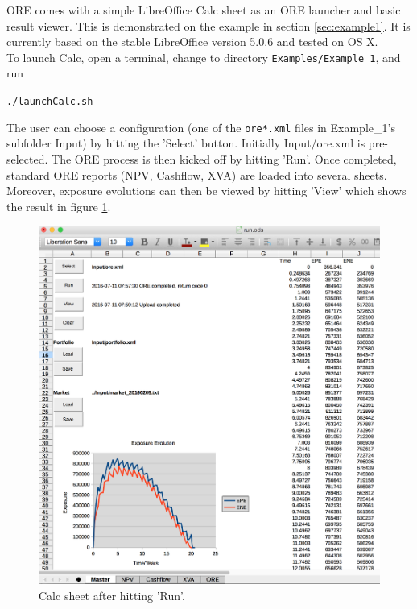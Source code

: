 \documentclass[12pt, a4paper]{article}
\begin{document}
ORE comes with a simple LibreOffice Calc \cite{LO} sheet as an ORE launcher and basic result viewer. This is
demonstrated on the example in section \ref{sec:example1}. It is currently based on the stable LibreOffice version 5.0.6
and tested on OS X. \\

To launch Calc, open a terminal, change to directory {\tt Examples/Example\_1}, and run

\medskip
{\centerline{\tt ./launchCalc.sh} }
\medskip

The user can choose a configuration (one of the {\tt ore*.xml} files in Example\_1's subfolder Input) by hitting the
'Select' button. Initially Input/ore.xml is pre-selected. The ORE process is then kicked off by hitting 'Run'. Once
completed, standard ORE reports (NPV, Cashflow, XVA) are loaded into several sheets. Moreover, exposure evolutions can
then be viewed by hitting 'View' which shows the result in figure \ref{fig_16}.  \\
\begin{figure}[h]
\begin{center}
\includegraphics[scale=0.4]{demo_calc_2}
\end{center}
\caption{Calc sheet after hitting 'Run'.}
\label{fig_16}
\end{figure}
\end{document}
